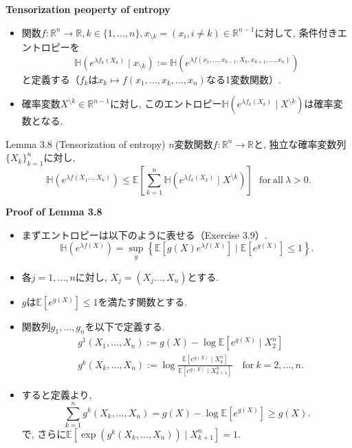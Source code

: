 \documentclass[aspectratio=169, dvipdfmx]{beamer}
\newcommand{\ex}{\mathbb{E}}
\begin{document}
\begin{frame}{}{}
{\bf Tensorization peoperty of entropy}
\begin{itemize}
    \item 関数$f:\mathbb{R}^n\to\mathbb{R}, k \in \{1,\dots,n\}, x_{\setminus k}=(x_i, i\ne k)\in\mathbb{R}^{n-1}$に対して,
    条件付きエントロピーを
    \[ \mathbb{H}(e^{\lambda f_k(X_k)} \mid x_{\setminus k}) := \mathbb{H}(e^{\lambda f(x_1,\dots,x_{k-1},X_k,x_{k+1},\dots,x_n)}) \]
    と定義する（$f_k$は$x_k\mapsto f(x_1,\dots,x_k,\dots,x_n)$なる1変数関数）.
    \item 確率変数$X^{\setminus k}\in \mathbb{R}^{n-1}$に対し,
    このエントロピー$\mathbb{H}(e^{\lambda f_k(X_k)} \mid X^{\setminus k})$は確率変数となる.
\end{itemize}
\begin{block}{Lemma 3.8 (Tensorization of entropy)}
$n$変数関数$f:\mathbb{R}^n \to \mathbb{R}$と, 独立な確率変数列$\{X_k\}_{k=1}^n$に対し,
\[
    \mathbb{H}(e^{\lambda f(X_1\dots,X_k)})
    \le \ex\left[ \sum_{k=1}^n\mathbb{H}(e^{\lambda f_k(X_k)} \mid X^{\setminus k}) \right]
    \ \ \ \mathrm{for\ all}\ \lambda > 0.
    \tag{3.21}\label{3.21}
\]
\end{block}
\end{frame}

\begin{frame}{}{}
{\bf Proof of Lemma 3.8}
\begin{itemize}
    \item まずエントロピーは以下のように表せる（Exercise 3.9）.
    \[
        \mathbb{H}\left(e^{\lambda f(X)}\right)
        = \sup _{g}\left\{\mathbb{E}\left[g(X) e^{\lambda f(X)}\right] \mid \mathbb{E}\left[e^{g(X)}\right] \leq 1\right\}.
        \tag{3.24}\label{3.24}
        \]
    \item 各$j = 1,\dots,n$に対し, $X_j = (X_j\dots,X_n)$とする.
    \item $g$は$\ex[e^{g(X)}]\le 1$を満たす関数とする.
    \item 関数列$g_1,\dots, g_n$を以下で定義する.
    \begin{align*}
        &g^{1}\left(X_{1}, \ldots, X_{n}\right):=g(X)-\log \mathbb{E}\left[e^{g(X)} \mid X_{2}^{n}\right] \\
        &g^{k}\left(X_{k}, \ldots, X_{n}\right):=\log \frac{\mathbb{E}\left[e^{g(X)} \mid X_{k}^{n}\right]}{\mathbb{E}\left[e^{g(X)} \mid X_{k+1}^{n}\right]} \quad \mathrm{for}\ k=2, \ldots, n.
    \end{align*}
    \item すると定義より,
    \[
        \sum_{k=1}^{n} g^{k}\left(X_{k}, \ldots, X_{n}\right)=g(X)-\log \mathbb{E}\left[e^{g(X)}\right] \geq g(X).
        \tag{3.25}\label{3.25}
    \]
    で, さらに$\ex[\exp(g^k(X_k,\dots,X_n))\mid X_{k+1}^n] = 1$.
\end{itemize}
\end{frame}
\end{document}
